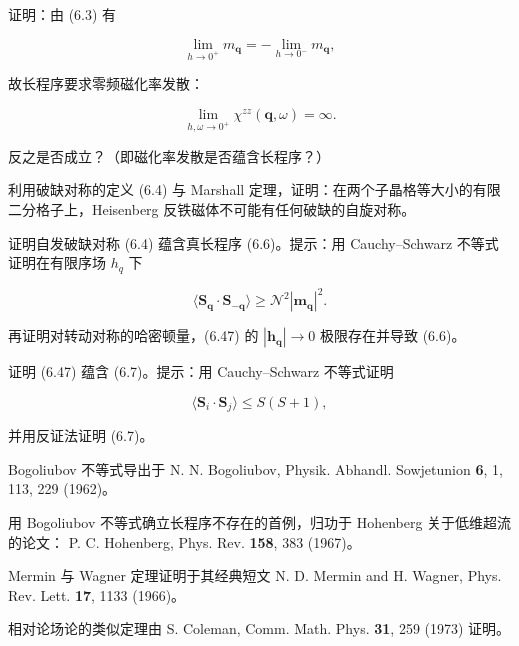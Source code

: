 \begin{exercises}

\item 证明：由 (6.3) 有

\begin{equation*}
\lim _ {h \to 0 ^ {+}} m _ {\mathbf {q}} = - \lim _ {h \to 0 ^ {-}} m _ {\mathbf {q}} ,
\tag{6.45}
\end{equation*}

故长程序要求零频磁化率发散：

\begin{equation*}
\lim _ {h, \omega \rightarrow 0 ^ {+}} \chi^ {zz} ( \mathbf {q}, \omega ) = \infty .
\tag{6.46}
\end{equation*}

反之是否成立？（即磁化率发散是否蕴含长程序？）

\item 利用破缺对称的定义 (6.4) 与 Marshall 定理，证明：在两个子晶格等大小的有限二分格子上，Heisenberg 反铁磁体不可能有任何破缺的自旋对称。

\item 证明自发破缺对称 (6.4) 蕴含真长程序 (6.6)。提示：用 Cauchy--Schwarz 不等式证明在有限序场 $h_{q}$ 下

\begin{equation*}
\langle \mathbf {S} _ {\mathbf {q}} \cdot \mathbf {S} _ {- \mathbf {q}} \rangle \geq \mathcal {N} ^ {2} \left| \mathbf {m} _ {\mathbf {q}} \right| ^ {2}.
\tag{6.47}
\end{equation*}

再证明对转动对称的哈密顿量，(6.47) 的 $|\mathbf{h}_{\mathbf{q}}| \to 0$ 极限存在并导致 (6.6)。

\item 证明 (6.47) 蕴含 (6.7)。提示：用 Cauchy--Schwarz 不等式证明

\begin{equation*}
\langle \mathbf {S} _ {i} \cdot \mathbf {S} _ {j} \rangle \leq S ( S + 1 ) ,
\tag{6.48}
\end{equation*}

并用反证法证明 (6.7)。

\end{exercises}

\begin{chapbib}
\item Bogoliubov 不等式导出于
  N. N. Bogoliubov, Physik. Abhandl. Sowjetunion \textbf{6}, 1, 113, 229 (1962)。
\item 用 Bogoliubov 不等式确立长程序不存在的首例，归功于 Hohenberg 关于低维超流的论文：
  P. C. Hohenberg, Phys. Rev. \textbf{158}, 383 (1967)。
\item Mermin 与 Wagner 定理证明于其经典短文
  N. D. Mermin and H. Wagner, Phys. Rev. Lett. \textbf{17}, 1133 (1966)。
\item 相对论场论的类似定理由
  S. Coleman, Comm. Math. Phys. \textbf{31}, 259 (1973)
  证明。
\end{chapbib}
